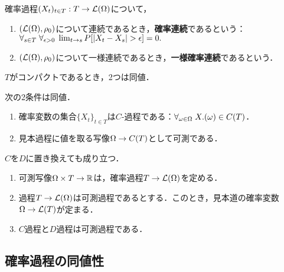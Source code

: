 \documentclass[uplatex,dvipdfmx]{jsreport}
\begin{document}
\begin{definition}[確率過程の連続性]
    確率過程$(X_t)_{t\in T}:T\to\mathcal{L}(\Omega)$について，
    \begin{enumerate}
        \item $(\mathcal{L}(\Omega),\rho_0)$について連続であるとき，\textbf{確率連続}であるという：$\forall_{s\in T}\;\forall_{\epsilon>0}\;\lim_{t\to s}P[\lvert X_t-X_s\rvert>\epsilon]=0.$
        \item $(\mathcal{L}(\Omega),\rho_0)$について一様連続であるとき，\textbf{一様確率連続}であるという．
    \end{enumerate}
    $T$がコンパクトであるとき，2つは同値．
\end{definition}

\begin{theorem}[2つのcurryingの等価性]
    次の2条件は同値．
    \begin{enumerate}
        \item 確率変数の集合$\{X_t\}_{t\in T}$は$C$-過程である：$\forall_{\omega\in\Omega}\;X.(\omega)\in C(T)$．
        \item 見本過程に値を取る写像$\Omega\to C(T)$として可測である．
    \end{enumerate}
    $C$を$D$に置き換えても成り立つ．
\end{theorem}

\begin{theorem}[可測過程]\mbox{}
    \begin{enumerate}
        \item 可測写像$\Omega\times T\to\mathbb{R}$は，確率過程$T\to\mathcal{L}(\Omega)$を定める．
        \item 過程$T\to\mathcal{L}(\Omega)$は可測過程であるとする．このとき，見本道の確率変数$\Omega\to\mathcal{L}(T)$が定まる．
        \item $C$過程と$D$過程は可測過程である．
    \end{enumerate}
\end{theorem}

\subsection{確率過程の同値性}
\end{document}

